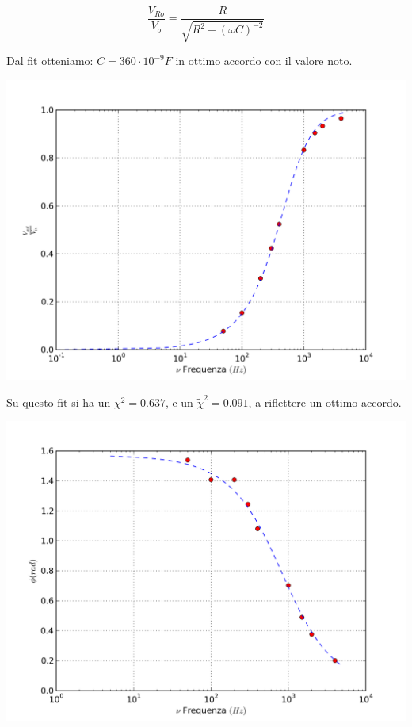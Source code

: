 $$\frac{V_{Ro}}{V_o} = \frac{R}{\sqrt{R^2+(\omega C)^{-2}}}$$

Dal fit otteniamo: $C=360 \cdot 10^{-9} F $ in ottimo accordo con il valore noto.

\begin{center}
 \includegraphics[scale=0.70]{grafici/C3/ddpcond.png}
\end{center}

Su questo fit si ha un $\chi^2=0.637$, e un $\tilde{\chi}^2 = 0.091$, a riflettere un ottimo accordo.

\begin{center}
 \includegraphics[scale=0.70]{grafici/C3/fasecap.png}
\end{center}

